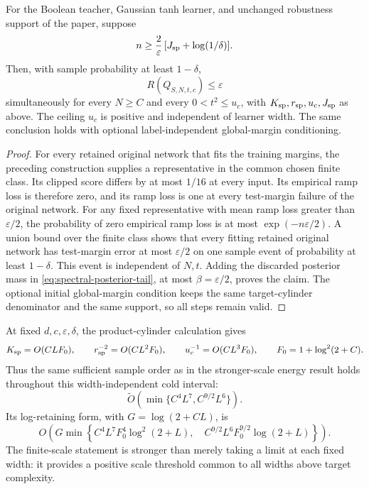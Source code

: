 \begin{theorem}
\label{thm:spectral-cold}
For the Boolean teacher, Gaussian tanh learner, and unchanged robustness
support of the paper, suppose
\[
 n\ge\frac2\varepsilon\,[J_{\rm sp}+\log(1/\delta)].
\]
Then, with sample probability at least $1-\delta$,
\[
 R(Q_{S,N,t,c})\le\varepsilon
\]
simultaneously for every $N\ge C$ and every $0<t^2\le u_c$, with
$K_{\rm sp},r_{\rm sp},u_c,J_{\rm sp}$ as above.
The ceiling $u_c$ is positive and independent of learner width.
The same conclusion holds with optional label-independent global-margin
conditioning.
\end{theorem}
\begin{proof}
For every retained original network that fits the training margins,
the preceding construction supplies a representative in the common
chosen finite class. Its clipped score differs by at most $1/16$ at
every input. Its empirical ramp loss is therefore zero, and its ramp
loss is one at every test-margin failure of the original network.
For any fixed representative with mean ramp loss greater than
$\varepsilon/2$, the probability of zero empirical ramp loss is at
most $\exp(-n\varepsilon/2)$. A union bound over the finite class shows
that every fitting retained original network has test-margin error
at most $\varepsilon/2$ on one sample event of probability at least
$1-\delta$. This event is independent of $N,t$.
Adding the discarded posterior mass in
\eqref{eq:spectral-posterior-tail}, at most $\beta=\varepsilon/2$,
proves the claim. The optional initial global-margin condition keeps
the same target-cylinder denominator and the same support, so all
steps remain valid.
\end{proof}

At fixed $d,c,\varepsilon,\delta$, the product-cylinder calculation gives
\[
 K_{\rm sp}=O(CLF_0),\qquad
 r_{\rm sp}^{-2}=O(CL^2F_0),\qquad
 u_c^{-1}=O(CL^3F_0),
 \qquad F_0=1+\log^2(2+C).
\]
Thus the same sufficient sample order as in the stronger-scale energy
result holds throughout this width-independent cold interval:
\[
 \widetilde O\!\left(\min\{C^4L^7,C^{9/2}L^6\}\right).
\]
Its log-retaining form, with $G=\log(2+CL)$, is
\[
 O\!\left(G\min\left\{
 C^4L^7F_0^4\log^2(2+L),\quad
 C^{9/2}L^6F_0^{9/2}\log(2+L)
 \right\}\right).
\]
The finite-scale statement is stronger than merely taking a limit at
each fixed width: it provides a positive scale threshold common to
all widths above target complexity.
